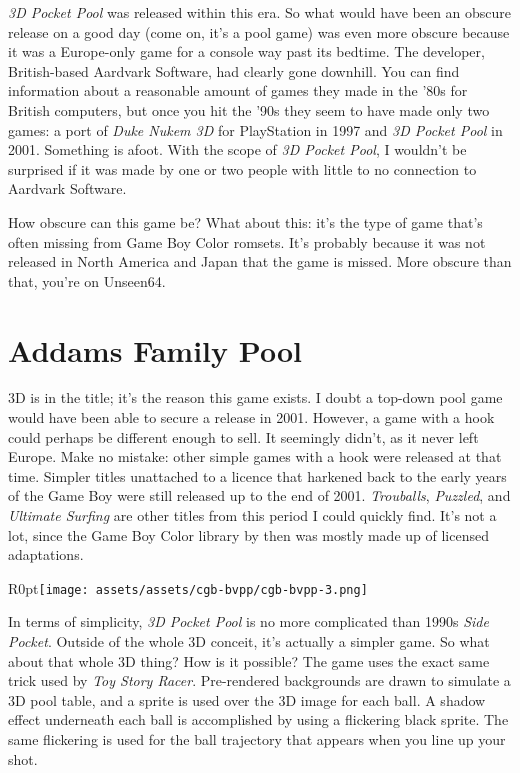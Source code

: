 \documentclass{book}
\begin{document}
\emph{3D Pocket Pool} was released within this era. So what would have been an obscure release on a good day (come on, it’s a pool game) was even more obscure because it was a Europe-only game for a console way past its bedtime. The developer, British-based Aardvark Software, had clearly gone downhill. You can find information about a reasonable amount of games they made in the ’80s for British computers, but once you hit the ’90s they seem to have made only two games: a port of \emph{Duke Nukem 3D} for PlayStation in 1997 and \emph{3D Pocket Pool} in 2001. Something is afoot. With the scope of \emph{3D Pocket Pool}, I wouldn’t be surprised if it was made by one or two people with little to no connection to Aardvark Software.\par
How obscure can this game be? What about this: it’s the type of game that’s often missing from Game Boy Color romsets. It’s probably because it was not released in North America and Japan that the game is missed. More obscure than that, you’re on Unseen64.\par
\FloatBarrier\section*{Addams Family Pool}
3D is in the title; it’s the reason this game exists. I doubt a top-down pool game would have been able to secure a release in 2001. However, a game with a hook could perhaps be different enough to sell. It seemingly didn’t, as it never left Europe. Make no mistake: other simple games with a hook were released at that time. Simpler titles unattached to a licence that harkened back to the early years of the Game Boy were still released up to the end of 2001. \emph{Trouballs}, \emph{Puzzled}, and \emph{Ultimate Surfing} are other titles from this period I could quickly find. It’s not a lot, since the Game Boy Color library by then was mostly made up of licensed adaptations.\par
\begin{wrapfigure}{R}{0pt}{\texttt{[image: assets/assets/cgb-bvpp/cgb-bvpp-3.png]}}\end{wrapfigure}
In terms of simplicity, \emph{3D Pocket Pool} is no more complicated than 1990s \emph{Side Pocket}. Outside of the whole 3D conceit, it’s actually a simpler game. So what about that whole 3D thing? How is it possible? The game uses the exact same trick used by \emph{Toy Story Racer}. Pre-rendered backgrounds are drawn to simulate a 3D pool table, and a sprite is used over the 3D image for each ball. A shadow effect underneath each ball is accomplished by using a flickering black sprite. The same flickering is used for the ball trajectory that appears when you line up your shot.\par
\end{document}
